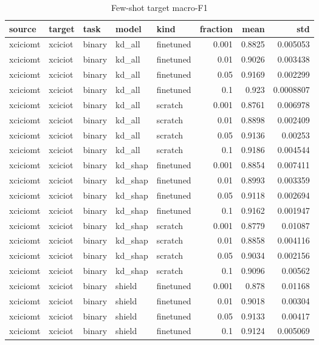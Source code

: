 \begin{table}
\caption{Few-shot target macro-F1}
\begin{tabular}{lllllrrr}
\toprule
source & target & task & model & kind & fraction & mean & std \\
\midrule
xciciomt & xciciot & binary & kd_all & finetuned & 0.001 & 0.8825 & 0.005053 \\
xciciomt & xciciot & binary & kd_all & finetuned & 0.01 & 0.9026 & 0.003438 \\
xciciomt & xciciot & binary & kd_all & finetuned & 0.05 & 0.9169 & 0.002299 \\
xciciomt & xciciot & binary & kd_all & finetuned & 0.1 & 0.923 & 0.0008807 \\
xciciomt & xciciot & binary & kd_all & scratch & 0.001 & 0.8761 & 0.006978 \\
xciciomt & xciciot & binary & kd_all & scratch & 0.01 & 0.8898 & 0.002409 \\
xciciomt & xciciot & binary & kd_all & scratch & 0.05 & 0.9136 & 0.00253 \\
xciciomt & xciciot & binary & kd_all & scratch & 0.1 & 0.9186 & 0.004544 \\
xciciomt & xciciot & binary & kd_shap & finetuned & 0.001 & 0.8854 & 0.007411 \\
xciciomt & xciciot & binary & kd_shap & finetuned & 0.01 & 0.8993 & 0.003359 \\
xciciomt & xciciot & binary & kd_shap & finetuned & 0.05 & 0.9118 & 0.002694 \\
xciciomt & xciciot & binary & kd_shap & finetuned & 0.1 & 0.9162 & 0.001947 \\
xciciomt & xciciot & binary & kd_shap & scratch & 0.001 & 0.8779 & 0.01087 \\
xciciomt & xciciot & binary & kd_shap & scratch & 0.01 & 0.8858 & 0.004116 \\
xciciomt & xciciot & binary & kd_shap & scratch & 0.05 & 0.9034 & 0.002156 \\
xciciomt & xciciot & binary & kd_shap & scratch & 0.1 & 0.9096 & 0.00562 \\
xciciomt & xciciot & binary & shield & finetuned & 0.001 & 0.878 & 0.01168 \\
xciciomt & xciciot & binary & shield & finetuned & 0.01 & 0.9018 & 0.00304 \\
xciciomt & xciciot & binary & shield & finetuned & 0.05 & 0.9133 & 0.00417 \\
xciciomt & xciciot & binary & shield & finetuned & 0.1 & 0.9124 & 0.005069 \\

\end{tabular}
\end{table}
